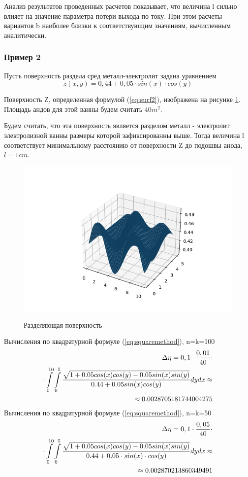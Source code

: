 \documentclass{article}
\begin{document}
Анализ результатов проведенных расчетов показывает, что величина l сильно влияет на значение параметра потери выхода по току. При этом расчеты вариантов b наиболее близки к соответствующим значениям, вычисленным аналитически. 

\subsubsection*{Пример 2}\label{ex2m}
Пусть поверхность раздела сред металл-электролит задана уравнением
\begin{equation}\label{eq:surf2}
z(x,y)=0,44+0,05 \cdot sin(x) \cdot cos(y)
\end{equation}

Поверхность Z, определенная формулой (\ref{eq:surf2}), изображена на рисунке \ref{fig:H2Surf}. Площадь андов для этой ванны будем считать $40 m^2$.

Будем считать, что эта поверхность является разделом металл - электролит электролизной ванны размеры которой зафиксированны выше. Тогда величина l соответствует минимальному расстоянию от поверхности Z до подошвы анода, $l=1 cm$.

\begin{figure}[H]
\centering
\includegraphics[width=0.8\linewidth]{Second_surface.png}
\caption{}
\label{fig:H2Surf}
Разделяющая поверхность
\end{figure}


Вычисления по квадратурной формуле (\ref{eq:squaremethod}), n=k=100
\begin{align}\label{eq:sq2min10}
\Delta \eta = 0,1 \cdot \frac{0,01}{40} \cdot \notag \\
\cdot \int\limits_0^{10} \int\limits_0^5 \frac{\sqrt{1+0.05cos(x)cos(y)-0.05sin(x)sin(y)}}{0.44 + 0.05sin(x)cos(y)} dy dx \approx \notag \\ \approx 0.0028705181744004275
\end{align}
Вычисления по квадратурной формуле (\ref{eq:squaremethod}), n=k=50
\begin{align}\label{eq:sq2min5}
\Delta \eta = 0,1 \cdot \frac{0,05}{40}  \cdot \notag \\
\cdot \int\limits_0^{10} \int\limits_0^5 \frac{\sqrt{1+0.05cos(x)cos(y)-0.05sin(x)sin(y)}}{0.44 + 0.05 \cdot sin(x) \cdot cos(y)} dy dx \approx \notag \\ \approx 0.002870213860349491
\end{align}
\end{document}
